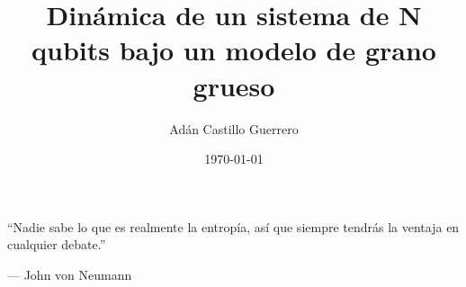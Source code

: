 \documentclass[12pt,twoside]{book}
\title{Dinámica de un sistema de N qubits bajo un modelo de grano grueso}
\author{Adán Castillo Guerrero}
\date{\today}
\begin{document}
\frontmatter






\cleardoublepage



\cleardoublepage
\hspace{0pt}
\vfill
\epigraph{``Nadie sabe lo que es realmente la entropía, así que siempre tendrás la ventaja en cualquier debate.''}{--- \textup{John von Neumann}}
\vfill
\hspace{0pt}

\cleardoublepage

\linenumbers
\modulolinenumbers[5]
\setlength\linenumbersep{3pt}
\makeatletter
\let\LN@align\align
\let\LN@endalign\endalign
\renewcommand{\align}{\linenomath\LN@align}
\renewcommand{\endalign}{\LN@endalign\endlinenomath}
\let\LN@gather\gather
\let\LN@endgather\endgather
\renewcommand{\gather}{\linenomath\LN@gather}
\renewcommand{\endgather}{\LN@endgather\endlinenomath}
\makeatother

\pagestyle{plain}
\tableofcontents
\newpage
\mainmatter





\appendix

%


\end{document}
